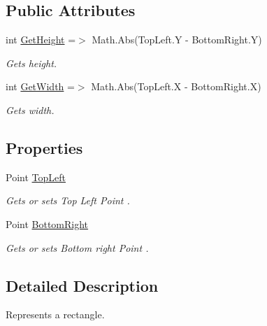 \subsection*{Public Attributes}
\begin{DoxyCompactItemize}
\item 
int \mbox{\hyperlink{class_test_project_1_1_task_library_1_1_tasks_1_1_lesson6_1_1_models_1_1_rectangle_a25ab4b890ebd7d83727f96ffbac1e817}{Get\+Height}} =$>$ Math.\+Abs(Top\+Left.\+Y -\/ Bottom\+Right.\+Y)
\begin{DoxyCompactList}\small\item\em Gets height. \end{DoxyCompactList}\item 
int \mbox{\hyperlink{class_test_project_1_1_task_library_1_1_tasks_1_1_lesson6_1_1_models_1_1_rectangle_a74ef96d15fc69f1b88666885efb40e0f}{Get\+Width}} =$>$ Math.\+Abs(Top\+Left.\+X -\/ Bottom\+Right.\+X)
\begin{DoxyCompactList}\small\item\em Gets width. \end{DoxyCompactList}\end{DoxyCompactItemize}
\subsection*{Properties}
\begin{DoxyCompactItemize}
\item 
Point \mbox{\hyperlink{class_test_project_1_1_task_library_1_1_tasks_1_1_lesson6_1_1_models_1_1_rectangle_a85aba54e7229df64372aacd0524a2c1e}{Top\+Left}}
\begin{DoxyCompactList}\small\item\em Gets or sets Top Left Point . \end{DoxyCompactList}\item 
Point \mbox{\hyperlink{class_test_project_1_1_task_library_1_1_tasks_1_1_lesson6_1_1_models_1_1_rectangle_a822c5acb5bc2fa4af7baa46be011d1a6}{Bottom\+Right}}
\begin{DoxyCompactList}\small\item\em Gets or sets Bottom right Point . \end{DoxyCompactList}\end{DoxyCompactItemize}


\subsection{Detailed Description}
Represents a rectangle. 



